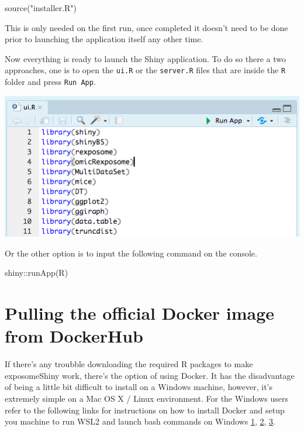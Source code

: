 \documentclass[
]{book}
\newenvironment{Shaded}{\begin{snugshade}}{\end{snugshade}}
\newcommand{\FunctionTok}[1]{\textcolor[rgb]{0.00,0.00,0.00}{#1}}
\newcommand{\NormalTok}[1]{#1}
\newcommand{\SpecialCharTok}[1]{\textcolor[rgb]{0.00,0.00,0.00}{#1}}
\newcommand{\StringTok}[1]{\textcolor[rgb]{0.31,0.60,0.02}{#1}}
\begin{document}
\begin{Shaded}
\begin{Highlighting}[]
\FunctionTok{source}\NormalTok{(}\StringTok{"installer.R"}\NormalTok{)}
\end{Highlighting}
\end{Shaded}

This is only needed on the first run, once completed it doesn't need to be done prior to launching the application itself any other time.

Now everything is ready to launch the Shiny application. To do so there a two approaches, one is to open the \texttt{ui.R} or the \texttt{server.R} files that are inside the \texttt{R} folder and press \texttt{Run\ App}.

\includegraphics{images/setup2.png}

Or the other option is to input the following command on the console.

\begin{Shaded}
\begin{Highlighting}[]
\NormalTok{shiny}\SpecialCharTok{::}\FunctionTok{runApp}\NormalTok{(}\StringTok{\textquotesingle{}R\textquotesingle{}}\NormalTok{)}
\end{Highlighting}
\end{Shaded}

\hypertarget{pulling-the-official-docker-image-from-dockerhub}{%
\section{Pulling the official Docker image from DockerHub}\label{pulling-the-official-docker-image-from-dockerhub}}

If there's any troubble downloading the required R packages to make exposomeShiny work, there's the option of using Docker. It has the disadvantage of being a little bit difficult to install on a Windows machine, however, it's extremely simple on a Mac OS X / Linux environment. For the Windows users refer to the following links for instructions on how to install Docker and setup you machine to run WSL2 and launch bash commands on Windows \href{https://docs.docker.com/docker-for-windows/install-windows-home/}{1}, \href{https://blog.nillsf.com/index.php/2020/02/17/setting-up-wsl2-windows-terminal-and-oh-my-zsh/}{2}, \href{https://docs.docker.com/docker-for-windows/wsl/}{3}.
\end{document}
